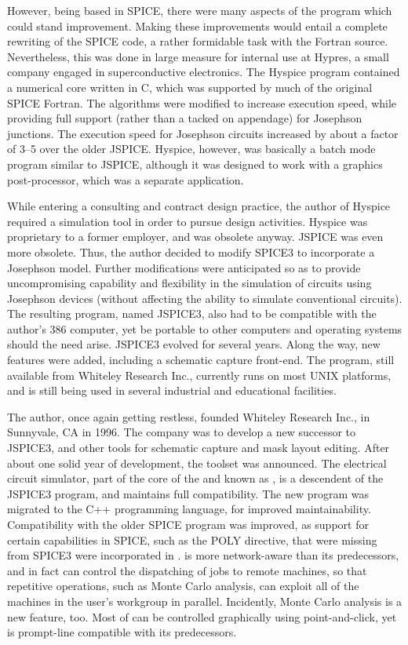 However, being based in SPICE, there were many aspects of the program
which could stand improvement.  Making these improvements would entail
a complete rewriting of the SPICE code, a rather formidable task with
the Fortran source.  Nevertheless, this was done in large measure for
internal use at Hypres, a small company engaged in superconductive
electronics.  The Hyspice program contained a numerical core written
in C, which was supported by much of the original SPICE Fortran.  The
algorithms were modified to increase execution speed, while providing
full support (rather than a tacked on appendage) for Josephson
junctions.  The execution speed for Josephson circuits increased by
about a factor of 3--5 over the older JSPICE.  Hyspice, however, was
basically a batch mode program similar to JSPICE, although it was
designed to work with a graphics post-processor, which was a separate
application.

While entering a consulting and contract design practice, the author
of Hyspice required a simulation tool in order to pursue design
activities.  Hyspice was proprietary to a former employer, and was
obsolete anyway.  JSPICE was even more obsolete.  Thus, the author
decided to modify SPICE3 to incorporate a Josephson model.  Further
modifications were anticipated so as to provide uncompromising
capability and flexibility in the simulation of circuits using
Josephson devices (without affecting the ability to simulate
conventional circuits).  The resulting program, named JSPICE3, also
had to be compatible with the author's 386 computer, yet be portable
to other computers and operating systems should the need arise. 
JSPICE3 evolved for several years.  Along the way, new features were
added, including a schematic capture front-end.  The program, still
available from Whiteley Research Inc., currently runs on most UNIX
platforms, and is still being used in several industrial and
educational facilities.

The author, once again getting restless, founded Whiteley Research
Inc., in Sunnyvale, CA in 1996.  The company was to develop a new
successor to JSPICE3, and other tools for schematic capture and mask
layout editing.  After about one solid year of development, the
{\XicTools} toolset was announced.  The electrical circuit simulator,
part of the core of the {\XicTools} and known as {\WRspice}, is a
descendent of the JSPICE3 program, and maintains full compatibility. 
The new program was migrated to the C++ programming language, for
improved maintainability.  Compatibility with the older SPICE program
was improved, as support for certain capabilities in SPICE, such as
the POLY directive, that were missing from SPICE3 were incorporated in
{\WRspice}.  {\WRspice} is more network-aware than its predecessors,
and in fact can control the dispatching of jobs to remote machines, so
that repetitive operations, such as Monte Carlo analysis, can exploit
all of the machines in the user's workgroup in parallel.  Incidently,
Monte Carlo analysis is a new feature, too.  Most of {\WRspice} can be
controlled graphically using point-and-click, yet is prompt-line
compatible with its predecessors.

